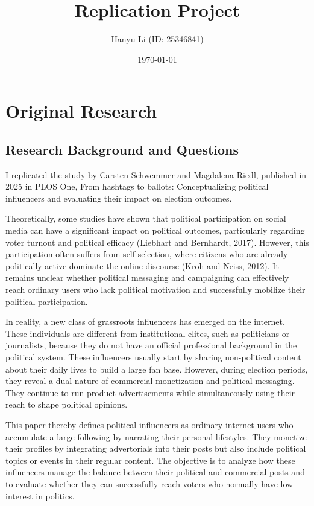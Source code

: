 \documentclass[12pt, a4paper]{article}
\title{\textbf{Replication Project}}
\author{Hanyu Li (ID: 25346841)}
\date{\today}
\begin{document}
	
	\maketitle
	\thispagestyle{empty} 
	
	\newpage
	\tableofcontents
	\newpage
	
	\section{Original Research}
	
	\subsection{Research Background and Questions}
	I replicated the study by Carsten Schwemmer and Magdalena Riedl, published in 2025 in PLOS One, From hashtags to ballots: Conceptualizing political influencers and evaluating their impact on election outcomes.
	
	Theoretically, some studies have shown that political participation on social media can have a significant impact on political outcomes, particularly regarding voter turnout and political efficacy (Liebhart and Bernhardt, 2017). However, this participation often suffers from self-selection, where citizens who are already politically active dominate the online discourse (Kroh and Neiss, 2012). It remains unclear whether political messaging and campaigning can effectively reach ordinary users who lack political motivation and successfully mobilize their political participation.
	
	In reality, a new class of grassroots influencers has emerged on the internet. These individuals are different from institutional elites, such as politicians or journalists, because they do not have an official professional background in the political system. These influencers usually start by sharing non-political content about their daily lives to build a large fan base. However, during election periods, they reveal a dual nature of commercial monetization and political messaging. They continue to run product advertisements while simultaneously using their reach to shape political opinions.
	
	This paper thereby defines political influencers as ordinary internet users who accumulate a large following by narrating their personal lifestyles. They monetize their profiles by integrating advertorials into their posts but also include political topics or events in their regular content. The objective is to analyze how these influencers manage the balance between their political and commercial posts and to evaluate whether they can successfully reach voters who normally have low interest in politics.
	
\end{document}
